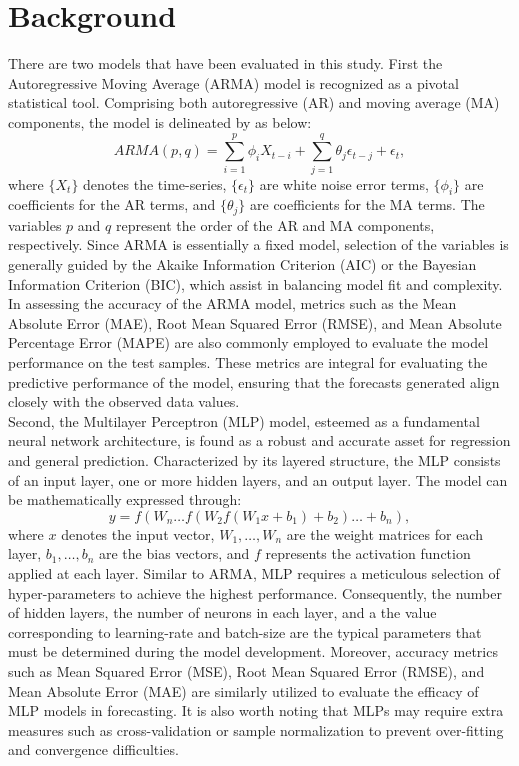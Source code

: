 \documentclass{article}
\begin{document}
\section{Background}
There are two models that have been evaluated in this study. First the Autoregressive Moving Average (ARMA) model is recognized as a pivotal statistical tool. Comprising both autoregressive (AR) and moving average (MA) components, the model is delineated by as below:
\begin{equation}
    ARMA(p, q) = \sum_{i=1}^p \phi_i X_{t-i} + \sum_{j=1}^q \theta_j \epsilon_{t-j} + \epsilon_t ,
\end{equation}
where \( \{X_t\} \) denotes the time-series, \( \{\epsilon_t\} \) are white noise error terms, \( \{\phi_i\} \) are coefficients for the AR terms, and \( \{\theta_j\} \) are coefficients for the MA terms. The variables \( p \) and \( q \) represent the order of the AR and MA components, respectively. 
Since ARMA is essentially a fixed model, selection of the  variables is generally guided by the Akaike Information Criterion (AIC) or the Bayesian Information Criterion (BIC), which assist in balancing model fit and complexity. In assessing the accuracy of the ARMA model, metrics such as the Mean Absolute Error (MAE), Root Mean Squared Error (RMSE), and Mean Absolute Percentage Error (MAPE) are also commonly employed to evaluate the model performance on the test samples. These metrics are integral for evaluating the predictive performance of the model, ensuring that the forecasts generated align closely with the observed data values.\\
Second, the Multilayer Perceptron (MLP) model, esteemed as a fundamental neural network architecture, is found as a robust and accurate asset for regression and general prediction. Characterized by its layered structure, the MLP consists of an input layer, one or more hidden layers, and an output layer. The model can be mathematically expressed through:
\begin{equation}
    y = f(W_n \dots f(W_2 f(W_1 x + b_1) + b_2) \dots + b_n),
\end{equation}
where \( x \) denotes the input vector, \( W_1, \dots, W_n \) are the weight matrices for each layer, \( b_1, \dots, b_n \) are the bias vectors, and \( f \) represents the activation function applied at each layer. Similar to ARMA, MLP requires a meticulous selection of hyper-parameters to achieve the highest performance. Consequently, the number of hidden layers, the number of neurons in each layer, and a the value corresponding to learning-rate and batch-size are the typical parameters that must be determined during the model development. Moreover, accuracy metrics such as Mean Squared Error (MSE), Root Mean Squared Error (RMSE), and Mean Absolute Error (MAE) are similarly utilized to evaluate the efficacy of MLP models in forecasting. It is also worth noting that MLPs may require extra measures such as cross-validation or sample normalization to prevent over-fitting and convergence difficulties.
\end{document}
